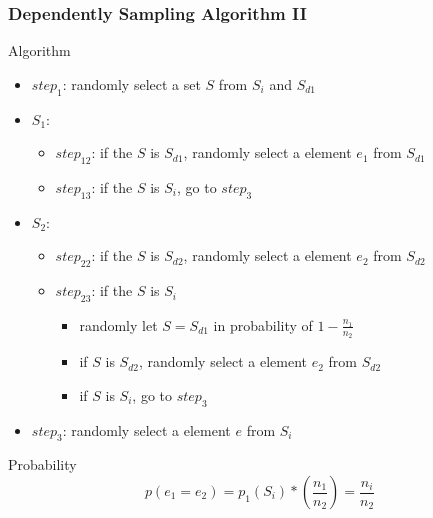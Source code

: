\documentclass[notheorems, aspectratio=54]{beamer}
\begin{document}
\begin{frame}
    \frametitle{Dependently Sampling Algorithm II}
    \begin{block}{Algorithm}
        \begin{itemize}
            \item $step_{1}$: randomly select a set $S$ from $S_i$ and $S_{d1}$
            \item $S_1$:
            \begin{itemize}
                \item $step_{12}$: if the $S$ is $S_{d1}$, randomly select a element $e_1$ from $S_{d1}$
                \item $step_{13}$: if the $S$ is $S_i$, go to $step_{3}$
            \end{itemize}
            \item $S_2$:
            \begin{itemize}
                \item $step_{22}$: if the $S$ is $S_{d2}$, randomly select a element $e_2$ from $S_{d2}$
                \item $step_{23}$: if the $S$ is $S_i$
                \begin{itemize}
                    \item randomly let $S = S_{d1}$ in probability of $1-\frac{n_1}{n_2}$
                    \item if $S$ is $S_{d2}$, randomly select a element $e_2$ from $S_{d2}$
                    \item if $S$ is $S_i$, go to $step_{3}$
                \end{itemize}
            \end{itemize}
            \item $step_{3}$: randomly select a element $e$ from $S_i$
        \end{itemize}
    \end{block}
    
    \begin{block}{Probability}
        $$
            p(e_1 = e_2) = p_1(S_i)*(\frac{n_1}{n_2}) = \frac{n_i}{n_2}
        $$
    \end{block}
\end{frame}
\end{document}
